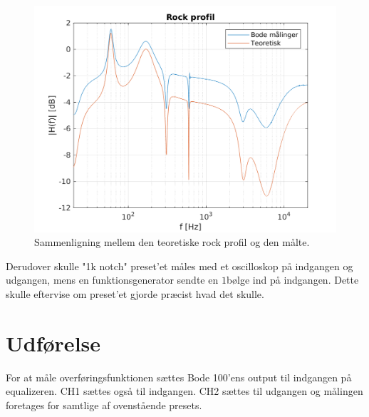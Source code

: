 \begin{figure}[h]
\includegraphics[]{matlabdemo/test/eq_rock.png}
\caption{Sammenligning mellem den teoretiske rock profil og den målte.}
\end{figure}



Derudover skulle "1k notch" preset'et måles med et oscilloskop på indgangen og udgangen, mens en funktionsgenerator sendte en $1$\kilo\hertz bølge ind på indgangen. Dette skulle eftervise om preset'et gjorde præcist hvad det skulle. \\

\section{Udførelse}
For at måle overføringsfunktionen sættes Bode 100'ens output til indgangen på equalizeren. CH1 sættes også til indgangen. CH2 sættes til udgangen og målingen foretages for samtlige af ovenstående presets. 

